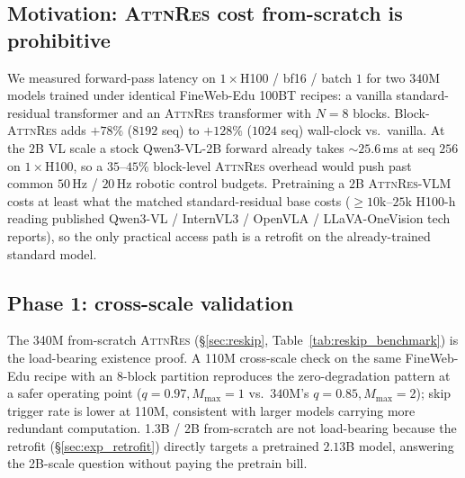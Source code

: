 \documentclass{article}
\newcommand{\attnres}{\textsc{AttnRes}}
\begin{document}
\subsection{Motivation: \attnres{} cost from-scratch is prohibitive}
\label{app:motivation}
We measured forward-pass latency on $1{\times}$H100 / bf16 / batch $1$ for two $340$M models trained under identical FineWeb-Edu 100BT recipes: a vanilla standard-residual transformer and an \attnres{} transformer with $N{=}8$ blocks. Block-\attnres{} adds $+78\%$ ($8192$ seq) to $+128\%$ ($1024$ seq) wall-clock vs.\ vanilla. At the $2$B VL scale a stock Qwen3-VL-2B forward already takes $\sim$$25.6$\,ms at seq $256$ on $1{\times}$H100, so a $35$--$45\%$ block-level \attnres{} overhead would push past common $50$\,Hz / $20$\,Hz robotic control budgets. Pretraining a $2$B \attnres{}-VLM costs at least what the matched standard-residual base costs ($\geq 10$k--$25$k H100-h reading published Qwen3-VL / InternVL3 / OpenVLA / LLaVA-OneVision tech reports), so the only practical access path is a retrofit on the already-trained standard model.

\subsection{Phase 1: cross-scale validation}
\label{app:phase1}
The 340M from-scratch \attnres{} (\S\ref{sec:reskip}, Table~\ref{tab:reskip_benchmark}) is the load-bearing existence proof. A 110M cross-scale check on the same FineWeb-Edu recipe with an $8$-block partition reproduces the zero-degradation pattern at a safer operating point ($q{=}0.97, M_{\max}{=}1$ vs.\ $340$M's $q{=}0.85, M_{\max}{=}2$); skip trigger rate is lower at 110M, consistent with larger models carrying more redundant computation. 1.3B / 2B from-scratch are not load-bearing because the retrofit (\S\ref{sec:exp_retrofit}) directly targets a pretrained $2.13$B model, answering the 2B-scale question without paying the pretrain bill.
\end{document}
